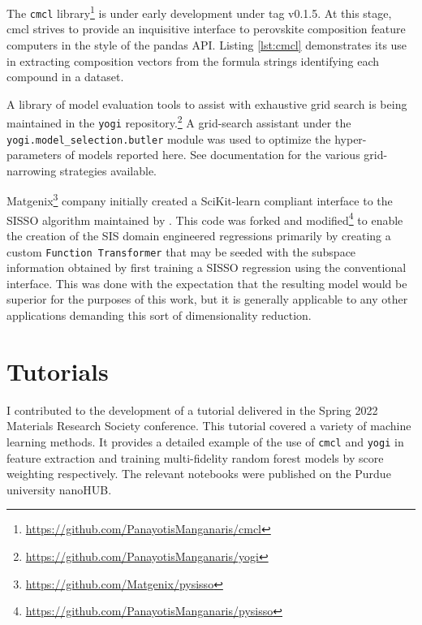 The \texttt{cmcl} library\footnote{\url{https://github.com/PanayotisManganaris/cmcl}} is under early development under tag v0.1.5.
At this stage, cmcl strives to provide an inquisitive interface to perovskite composition feature computers in the style of the pandas API.
Listing \ref{lst:cmcl} demonstrates its use in extracting composition vectors from the formula strings identifying each compound in a dataset.

A library of model evaluation tools to assist with exhaustive grid search is being maintained in the \texttt{yogi} repository.\footnote{\url{https://github.com/PanayotisManganaris/yogi}}
A grid-search assistant under the \texttt{yogi.model\_selection.butler} module was used to optimize the hyper-parameters of models reported here.
See documentation for the various grid-narrowing strategies available.
\nocite{manganaris-2022-mrs-comput}
\nocite{yang-2023-high-throug}
\nocite{manganaris-2023-multi-fidel}
\nocite{gollapalli-2023-graph-neural}
\nocite{edlabadkar-2023-drivin-halid}
\nocite{yang-2023-discov-novel}

Matgenix\footnote{\url{https://github.com/Matgenix/pysisso}} company initially created a SciKit-learn compliant interface to the SISSO algorithm maintained by \textcite{ouyang-2018-sisso}.
This code was forked and modified\footnote{\url{https://github.com/PanayotisManganaris/pysisso}} to enable the creation of the SIS domain engineered regressions primarily by creating a custom \texttt{Function Transformer} that may be seeded with the subspace information obtained by first training a SISSO regression using the conventional interface.
This was done with the expectation that the resulting model would be superior for the purposes of this work, but it is generally applicable to any other applications demanding this sort of dimensionality reduction.
\makeatletter
{}
  {\list
     {}
     {\setlength{\bibhang}{1in} %
      \setlength{\itemindent}{1in}%
      \setlength{\itemsep}{\bibitemsep}%
      \setlength{\leftmargin}{0pt}%
      \setlength{\parsep}{\bibparsep}%
      \setlength{\rightmargin}{0.33in}%
      }%
      \renewcommand*{\makelabel}[1]{\hss##1}}
  {\endlist}
  {\item}
\makeatother

\section{Tutorials}
\label{sec:org5689b18}
I contributed to the development of a tutorial delivered in the Spring 2022 Materials Research Society conference.
This tutorial covered a variety of machine learning methods.
It provides a detailed example of the use of \texttt{cmcl} and \texttt{yogi} in feature extraction and training multi-fidelity random forest models by score weighting respectively.
The relevant notebooks were published on the Purdue university nanoHUB.
\printbibliography[heading=none,category=myarticles]
